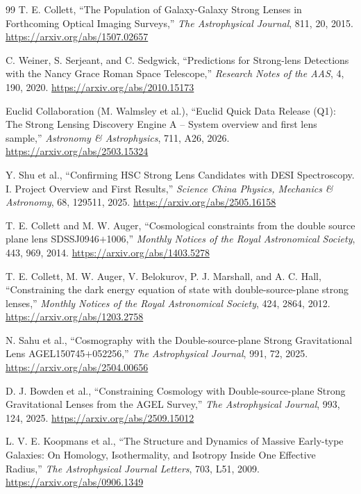 \begin{thebibliography}{99}
T. E. Collett,
``The Population of Galaxy-Galaxy Strong Lenses in Forthcoming Optical Imaging Surveys,''
\emph{The Astrophysical Journal}, 811, 20, 2015.
\url{https://arxiv.org/abs/1507.02657}

C. Weiner, S. Serjeant, and C. Sedgwick,
``Predictions for Strong-lens Detections with the Nancy Grace Roman Space Telescope,''
\emph{Research Notes of the AAS}, 4, 190, 2020.
\url{https://arxiv.org/abs/2010.15173}

Euclid Collaboration (M. Walmsley et al.),
``Euclid Quick Data Release (Q1): The Strong Lensing Discovery Engine A -- System overview and first lens sample,''
\emph{Astronomy \& Astrophysics}, 711, A26, 2026.
\url{https://arxiv.org/abs/2503.15324}

Y. Shu et al.,
``Confirming HSC Strong Lens Candidates with DESI Spectroscopy. I. Project Overview and First Results,''
\emph{Science China Physics, Mechanics \& Astronomy}, 68, 129511, 2025.
\url{https://arxiv.org/abs/2505.16158}

T. E. Collett and M. W. Auger,
``Cosmological constraints from the double source plane lens SDSSJ0946$+$1006,''
\emph{Monthly Notices of the Royal Astronomical Society}, 443, 969, 2014.
\url{https://arxiv.org/abs/1403.5278}

T. E. Collett, M. W. Auger, V. Belokurov, P. J. Marshall, and A. C. Hall,
``Constraining the dark energy equation of state with double-source-plane strong lenses,''
\emph{Monthly Notices of the Royal Astronomical Society}, 424, 2864, 2012.
\url{https://arxiv.org/abs/1203.2758}

N. Sahu et al.,
``Cosmography with the Double-source-plane Strong Gravitational Lens AGEL150745$+$052256,''
\emph{The Astrophysical Journal}, 991, 72, 2025.
\url{https://arxiv.org/abs/2504.00656}

D. J. Bowden et al.,
``Constraining Cosmology with Double-source-plane Strong Gravitational Lenses from the AGEL Survey,''
\emph{The Astrophysical Journal}, 993, 124, 2025.
\url{https://arxiv.org/abs/2509.15012}

L. V. E. Koopmans et al.,
``The Structure and Dynamics of Massive Early-type Galaxies: On Homology, Isothermality, and Isotropy Inside One Effective Radius,''
\emph{The Astrophysical Journal Letters}, 703, L51, 2009.
\url{https://arxiv.org/abs/0906.1349}


\end{thebibliography}
